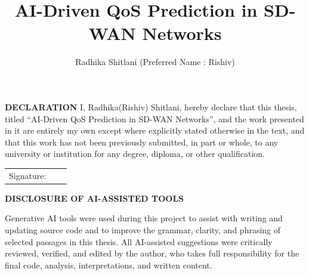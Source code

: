 \documentclass[a4paper,12pt]{Classes/RoboticsLaTeX}
\title{\Large{AI-Driven QoS Prediction in SD-WAN Networks}}
\author{Radhika Shitlani (Preferred Name : Rishiv)}
\begin{document}
		{\linespread{1}\selectfont\maketitle}

	\newpage\null\thispagestyle{empty}\newpage
	
	\setcounter{secnumdepth}{3}
	\setcounter{tocdepth}{3}
	
	\frontmatter
	
	\textbf{DECLARATION} 
	I, Radhika(Rishiv) Shitlani, hereby declare that this thesis, titled ``AI-Driven QoS Prediction in SD-WAN Networks'', and the work presented in it are entirely my own except where explicitly stated otherwise in the text, and that this work has not been previously submitted, in part or whole, to any university or institution for any degree, diploma, or other qualification. 
	\newline
	
	\begin{tabular}{@{}p{.9in}p{3.4in}@{}}
		Signature: & ~~\hrulefill \\
	\end{tabular}

	\vspace{1.5em}
	\textbf{DISCLOSURE OF AI-ASSISTED TOOLS}

	Generative AI tools were used during this project to assist with writing and updating source code and to improve the grammar, clarity, and phrasing of selected passages in this thesis. All AI-assisted suggestions were critically reviewed, verified, and edited by the author, who takes full responsibility for the final code, analysis, interpretations, and written content.
	\newpage
	
	
	
\end{document}
